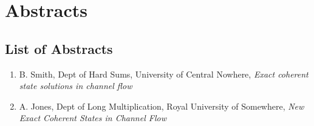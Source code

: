 \section{Abstracts}
\subsection*{List of Abstracts}
\begin{enumerate}[label=A\arabic*]
\item B. Smith, Dept of Hard Sums, University of Central Nowhere, {\em Exact coherent state solutions in channel flow}

\item A. Jones, Dept of Long Multiplication, Royal University of Somewhere, {\em New Exact Coherent States in Channel Flow}
\end{enumerate}
\newpage
{}%
\renewcommand*{\thepage}{A\arabic{page}}




